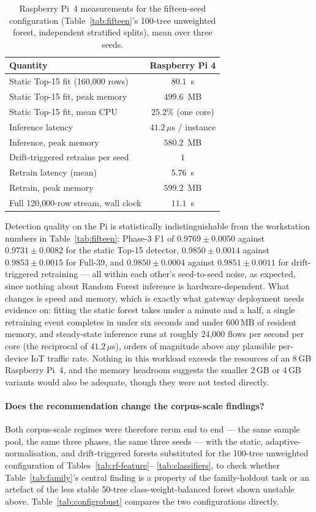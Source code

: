 \documentclass[11pt,a4paper]{article}
\begin{document}
\begin{table}[!ht]
\centering
\caption{Raspberry Pi~4 measurements for the fifteen-seed configuration
(Table~\ref{tab:fifteen}'s 100-tree unweighted forest, independent
stratified splits), mean over three seeds.}
\label{tab:pi15}
\small
\begin{tabular}{lc}
\toprule
\textbf{Quantity} & \textbf{Raspberry Pi 4} \\
\midrule
Static Top-15 fit (160{,}000 rows) & $80.1$~s \\
Static Top-15 fit, peak memory & $499.6$~MB \\
Static Top-15 fit, mean CPU & $25.2\%$ (one core) \\
Inference latency & $41.2\,\mu$s / instance \\
Inference, peak memory & $580.2$~MB \\
Drift-triggered retrains per seed & $1$ \\
Retrain latency (mean) & $5.76$~s \\
Retrain, peak memory & $599.2$~MB \\
Full 120{,}000-row stream, wall clock & $11.1$~s \\
\bottomrule
\end{tabular}
\end{table}

Detection quality on the Pi is statistically indistinguishable from the
workstation numbers in Table~\ref{tab:fifteen}: Phase-3 F1 of
$0.9769 \pm 0.0050$ against $0.9731 \pm 0.0082$ for the static Top-15
detector, $0.9850 \pm 0.0014$ against $0.9853 \pm 0.0015$ for Full-39, and
$0.9850 \pm 0.0004$ against $0.9851 \pm 0.0011$ for drift-triggered
retraining --- all within each other's seed-to-seed noise, as expected,
since nothing about Random Forest inference is hardware-dependent. What
changes is speed and memory, which is exactly what gateway deployment
needs evidence on: fitting the static forest takes under a minute and a
half, a single retraining event completes in under six seconds and under
600\,MB of resident memory, and steady-state inference runs at roughly
24{,}000 flows per second per core (the reciprocal of $41.2\,\mu$s), orders
of magnitude above any plausible per-device IoT traffic rate. Nothing in
this workload exceeds the resources of an 8\,GB Raspberry Pi~4, and the
memory headroom suggests the smaller 2\,GB or 4\,GB variants would also be
adequate, though they were not tested directly.

\paragraph{Does the recommendation change the corpus-scale findings?} Both
corpus-scale regimes were therefore rerun end to end --- the same sample pool,
the same three phases, the same three seeds --- with the static,
adaptive-normalisation, and drift-triggered forests substituted for the
100-tree unweighted configuration of Tables~\ref{tab:rf-feature}--%
\ref{tab:classifiers}, to check whether Table~\ref{tab:family}'s central
finding is a property of the family-holdout task or an artefact of the
less stable 50-tree class-weight-balanced forest shown unstable above.
Table~\ref{tab:configrobust} compares the two configurations directly.
\end{document}
